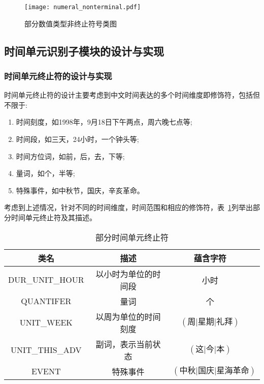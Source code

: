 \begin{figure}[h]
    \centering
    \texttt{[image: numeral\_nonterminal.pdf]}
    \caption{部分数值类型非终止符号类图}
    \label{fig:numeral_nonterminal}
\end{figure}

\subsection{时间单元识别子模块的设计与实现}

\subsubsection{时间单元终止符的设计与实现}


时间单元终止符的设计主要考虑到中文时间表达的多个时间维度即修饰符，包括但不限于:
\begin{enumerate}
    \item 时间刻度，如1998年，9月18日下午两点，周六晚七点等;
    \item 时间段，如三天，24小时，一个钟头等;
    \item 时间方位词，如前，后，去，下等;
    \item 量词，如个，半等;
    \item 特殊事件，如中秋节，国庆，辛亥革命。
\end{enumerate}

考虑到上述情况，针对不同的时间维度，时间范围和相应的修饰符，表~\ref{tab:date_terminal}列举出部分时间单元终止符及其描述。


\begin{table}[h]
    \centering
    \caption{部分时间单元终止符}
    \begin{tabular}{*{4}{c}}
        \toprule
        类名            & 描述                 & 蕴含字符                                 \\
        \midrule
        DUR\_UNIT\_HOUR & 以小时为单位的时间段 & 小时                                     \\
        QUANTIFER       & 量词                 & 个                                       \\
        UNIT\_WEEK      & 以周为单位的时间刻度 & $\left(\text{周|星期|礼拜}\right)$       \\
        UNIT\_THIS\_ADV & 副词，表示当前状态   & $\left(\text{这|今|本}\right)$           \\
        EVENT           & 特殊事件             & $\left(\text{中秋|国庆|星海革命}\right)$ \\
        \bottomrule
    \end{tabular}
    \label{tab:date_terminal}
\end{table}


